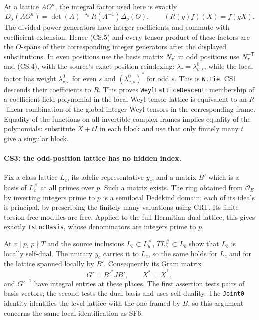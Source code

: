 \documentclass[11pt,a4paper]{article}
\numberwithin{equation}{section}
\theoremstyle{remark}\newtheorem{remark}[theorem]{Remark}
\begin{document}
At a lattice $A O^n$, the integral factor used here is exactly
\[
 D_\lambda(AO^n)=
 \det(A)^{-\lambda_n}\,R(A^{-1})\Delta_\nu(O),\qquad
 (R(g)f)(X)=f(gX).                                      \tag{CS.5}
\]
The divided-power generators have integer coefficients and commute
with coefficient extension. Hence (CS.5) and every tensor product of
these factors are the $O$-spans of their corresponding integer
generators after the displayed substitutions. In even positions use
the basis matrix $N_\tau$; in odd positions use $N_\tau^{-\mathsf T}$
and (CS.4), with the source's exact position reindexing: $\lambda_\tau=\lambda^0_{v,s}$,
while the local factor has weight $\lambda^0_{v,s}$ for even $s$ and
$(\lambda^0_{v,s})^*$ for odd $s$. This is \texttt{WtTie}. CS1 descends their coefficients to $R$.
This proves \texttt{WeylLatticeDescent}: membership of a coefficient-field
polynomial in the local Weyl tensor lattice is equivalent to an
$R$-linear combination of the global integer Weyl tensors in the
corresponding frame. Equality of the functions on all invertible complex
frames implies equality of the polynomials: substitute $X+tI$ in each
block and use that only finitely many $t$ give a singular block.

\paragraph{CS3: the odd-position lattice has no hidden index.}
Fix a class lattice $L_c$, its adelic representative $y_c$, and a
matrix $B'$ which is a basis of $L_c^\#$ at all primes over $p$.
Such a matrix exists. The ring obtained from $\mathcal O_E$ by
inverting integers prime to $p$ is a semilocal Dedekind domain;
each of its ideals is principal, by prescribing the finitely many
valuations using CRT. Its finite torsion-free modules are free.
Applied to the full Hermitian dual lattice, this gives exactly
\texttt{IsLocBasis}, whose denominators are integers prime to $p$.

At $v\mid p$, $p\nmid T$ and the source inclusions
$L_b\subset L_b^\#$, $T L_b^\#\subset L_b$ show that $L_b$ is
locally self-dual. The unitary $y_c$ carries it to $L_c$, so the same
holds for $L_c$ and for the lattice spanned locally by $B'$.
Consequently its Gram matrix
\[
 G'=B'^*JB',\qquad X^*=\bar X^{\mathsf T},
\]
and $G'^{-1}$ have integral entries at these places. The first assertion
tests pairs of basis vectors; the second tests the dual basis and uses
self-duality. The \texttt{Joint0} identity identifies the level lattice
with the one framed by $B$, so this argument concerns the same local
identification as SF6.
\end{document}
